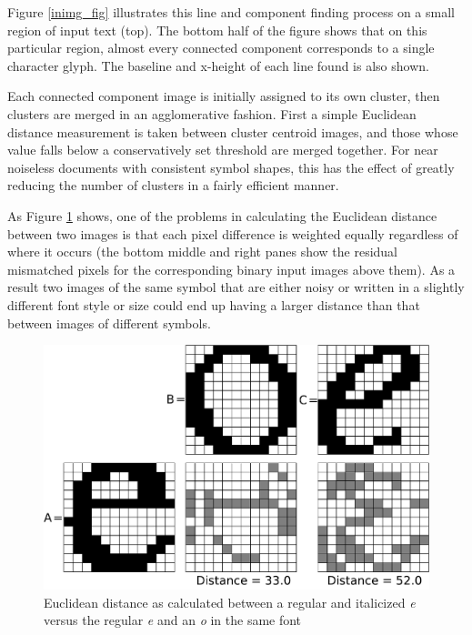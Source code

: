 \documentclass[times, 10pt,twocolumn]{article}
\begin{document}
Figure \ref{inimg_fig} illustrates this line and component finding process on a
small region of input text (top).  The bottom half of the figure shows that on
this particular region, almost every connected component corresponds to a
single character glyph.  The baseline and x-height of each line found is also
shown.

Each connected component image is initially assigned to its own cluster, then
clusters are merged in an agglomerative fashion.  First a simple Euclidean
distance measurement is taken between cluster centroid images, and those whose
value falls below a conservatively set threshold are merged together.  For near
noiseless documents with consistent symbol shapes, this has the effect of 
greatly reducing the number of clusters in a fairly efficient manner.

As Figure \ref{eucdist_fig} shows, one of the problems in calculating the 
Euclidean distance between two images is that each pixel difference is weighted 
equally regardless of where it occurs (the bottom middle and right panes show
the residual mismatched pixels for the corresponding binary input images above
them).  As a result two images of the same symbol that are either noisy or 
written in a slightly different font style or size could end up having a larger 
distance than that between images of different symbols.

\begin{figure}[ht]
  \centering
  \includegraphics[scale=0.3]{figures/euc_dist_comparisons}
  \caption{Euclidean distance as calculated between a regular and italicized
  {\em e} versus the regular {\em e} and an {\em o} in the same font}
  \label{eucdist_fig}
\end{figure}
\end{document}
